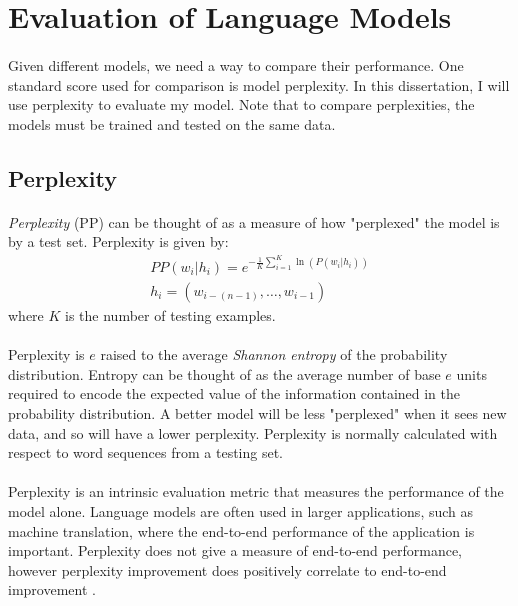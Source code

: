 \section {Evaluation of Language Models}
\paragraph{}
Given different models, we need a way to compare their performance. One standard score used for comparison is model perplexity. In this dissertation, I will use perplexity to evaluate my model. Note that to compare perplexities, the models must be trained and tested on the same data.
\subsection{Perplexity} \label{sec:perplexity}
\paragraph{}
\emph{Perplexity} (PP) can be thought of as a measure of how "perplexed" the model is by a test set.
Perplexity is given by:
\begin{align}
PP(w_i | h_i)=e^{- \frac{1}{K} \sum_{i=1}^K \ln( P(w_i | h_i) ) } \label{eq:perplexity}
\\ h_i = ( w_{i-(n-1)},\dots, w_{i-1} ) \nonumber
\end{align}
where $K$ is the number of testing examples. 
\paragraph{}
Perplexity is $e$ raised to the average \emph{Shannon entropy} of the probability distribution. Entropy can be thought of as the average number of base $e$ units required to encode the expected value of the information contained in the probability distribution. A better model will be less "perplexed" when it sees new data, and so will have a lower perplexity.  Perplexity is normally calculated with respect to word sequences from a testing set. 
\paragraph{}
Perplexity is an intrinsic evaluation metric that measures the performance of the model alone. Language models are often used in larger applications, such as machine translation, where the end-to-end performance of the application is important. Perplexity does not give a measure of end-to-end performance, however perplexity improvement does positively correlate to end-to-end improvement \cite{Jurafsky2009}.
